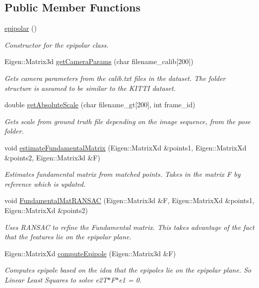 \subsection*{Public Member Functions}
\begin{DoxyCompactItemize}
\item 
\hyperlink{classepipolar_af5946f7532025b261a04dac12e18946d}{epipolar} ()
\begin{DoxyCompactList}\small\item\em Constructor for the epipolar class. \end{DoxyCompactList}\item 
Eigen\+::\+Matrix3d \hyperlink{classepipolar_a704a496c08556dac8133ec1b403e728c}{get\+Camera\+Params} (char filename\+\_\+calib\mbox{[}200\mbox{]})
\begin{DoxyCompactList}\small\item\em Gets camera parameters from the calib.\+txt files in the dataset. The folder structure is assumed to be similar to the K\+I\+T\+TI dataset. \end{DoxyCompactList}\item 
double \hyperlink{classepipolar_a7afbdbd2643ef41ca10bd7ad053f3762}{get\+Absolute\+Scale} (char filename\+\_\+gt\mbox{[}200\mbox{]}, int frame\+\_\+id)
\begin{DoxyCompactList}\small\item\em Gets scale from ground truth file depending on the image sequence, from the pose folder. \end{DoxyCompactList}\item 
void \hyperlink{classepipolar_a7c50ca7a4431c5e08a848bed9dba878e}{estimate\+Fundamental\+Matrix} (Eigen\+::\+Matrix\+Xd \&points1, Eigen\+::\+Matrix\+Xd \&points2, Eigen\+::\+Matrix3d \&F)
\begin{DoxyCompactList}\small\item\em Estimates fundamental matrix from matched points. Takes in the matrix F by reference which is updated. \end{DoxyCompactList}\item 
void \hyperlink{classepipolar_a8530a3ec65e1915ee7df1c555c74014e}{Fundamental\+Mat\+R\+A\+N\+S\+AC} (Eigen\+::\+Matrix3d \&F, Eigen\+::\+Matrix\+Xd \&points1, Eigen\+::\+Matrix\+Xd \&points2)
\begin{DoxyCompactList}\small\item\em Uses R\+A\+N\+S\+AC to refine the Fundamental matrix. This takes advantage of the fact that the features lie on the epipolar plane. \end{DoxyCompactList}\item 
Eigen\+::\+Matrix\+Xd \hyperlink{classepipolar_ad5ce6ee9ac5df7f8f02e4c48686cc637}{compute\+Epipole} (Eigen\+::\+Matrix3d \&F)
\begin{DoxyCompactList}\small\item\em Computes epipole based on the idea that the epipoles lie on the epipolar plane. So Linear Least Squares to solve e2\+T$\ast$\+F$\ast$e1 = 0. \end{DoxyCompactList}\end{DoxyCompactItemize}


